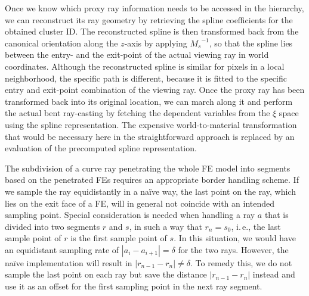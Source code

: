 \documentclass[journal]{vgtc}                %
\begin{document}
Once we know which proxy ray information needs to be accessed in the hierarchy, we can reconstruct its ray geometry by retrieving the spline coefficients for the obtained cluster ID. The reconstructed spline is then transformed back from the canonical orientation along the $z$-axis by applying ${M_s}^{-1}$, so that the spline lies between the entry- and the exit-point of the actual viewing ray in world coordinates. Although the reconstructed spline is similar for pixels in a local neighborhood, the specific path is different, because it is fitted to the specific entry and exit-point combination of the viewing ray. Once the proxy ray has been transformed back into its original location, we can march along it and perform the actual bent ray-casting by fetching the dependent variables from the $\xi$ space using the spline representation. The expensive world-to-material transformation that would be necessary here in the straightforward approach is replaced by an evaluation of the precomputed spline representation. %

The subdivision of a curve ray penetrating the whole FE model into segments based on the penetrated FEs requires an appropriate border handling scheme. If we sample the ray equidistantly in a na\"ive way, the last point on the ray, which lies on the exit face of a FE, will in general not coincide with an intended sampling point. Special consideration is needed when handling a ray $a$ that is divided into two segments $r$ and $s$, in such a way that $r_n = s_0$, i.\,e., the last sample point of $r$ is the first sample point of $s$. In this situation, we would have an equidistant sampling rate of $\left|a_i - a_{i+1}\right| = \delta$ for the two rays. However, the na\"ive implementation will result in $\left|r_{n-1} - r_{n}\right| \neq \delta$. To remedy this, we do not sample the last point on each ray but save the distance $\left|r_{n-1} - r_{n}\right|$ instead and use it as an offset for the first sampling point in the next ray segment.
%
%
%
\end{document}
